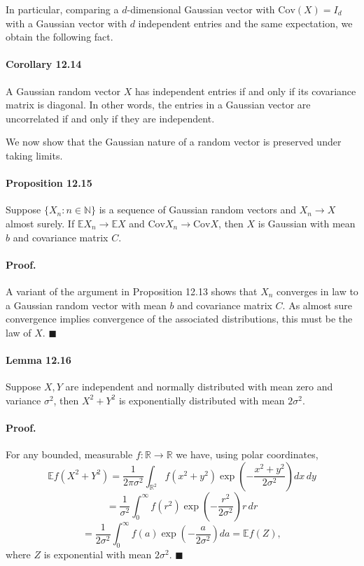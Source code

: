 \documentclass{article}
\begin{document}
In particular, comparing a $d$-dimensional Gaussian vector with $\text{Cov}(X) = I_d$ with a Gaussian vector with $d$ independent entries and the same expectation, we obtain the following fact.

\paragraph{Corollary 12.14} A Gaussian random vector $X$ has independent entries if and only if its covariance matrix is diagonal. In other words, the entries in a Gaussian vector are uncorrelated if and only if they are independent.

We now show that the Gaussian nature of a random vector is preserved under taking limits.

\paragraph{Proposition 12.15} Suppose $\{X_n : n \in \mathbb{N}\}$ is a sequence of Gaussian random vectors and $X_n \rightarrow X$ almost surely. If $\mathbb{E}X_n \rightarrow \mathbb{E}X$ and $\text{Cov} X_n \rightarrow \text{Cov} X$, then $X$ is Gaussian with mean $b$ and covariance matrix $C$.

\paragraph{Proof.} A variant of the argument in Proposition 12.13 shows that $X_n$ converges in law to a Gaussian random vector with mean $b$ and covariance matrix $C$. As almost sure convergence implies convergence of the associated distributions, this must be the law of $X$. \hfill $\blacksquare$

\paragraph{Lemma 12.16} Suppose $X, Y$ are independent and normally distributed with mean zero and variance $\sigma^2$, then $X^2 + Y^2$ is exponentially distributed with mean $2\sigma^2$.

\paragraph{Proof.} For any bounded, measurable $f: \mathbb{R} \rightarrow \mathbb{R}$ we have, using polar coordinates,
\[
\mathbb{E}f(X^2 + Y^2) = \frac{1}{2\pi\sigma^2} \int_{\mathbb{R}^2} f(x^2 + y^2) \exp\left(-\frac{x^2 + y^2}{2\sigma^2}\right) dx \, dy
\]
\[
= \frac{1}{\sigma^2} \int_0^{\infty} f(r^2) \exp\left(-\frac{r^2}{2\sigma^2}\right) r \, dr
\]
\[
= \frac{1}{2\sigma^2} \int_0^{\infty} f(a) \exp\left(-\frac{a}{2\sigma^2}\right) da = \mathbb{E}f(Z),
\]
where $Z$ is exponential with mean $2\sigma^2$. \hfill $\blacksquare$
\end{document}
